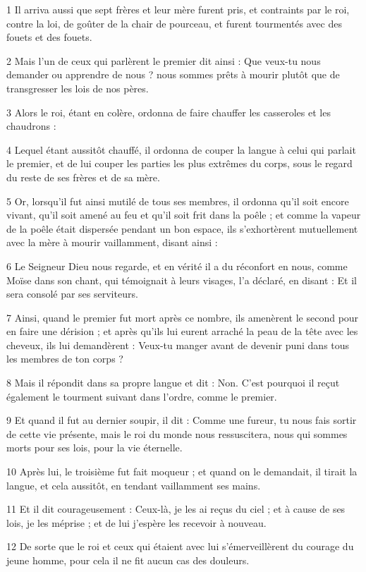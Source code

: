 \par 1 Il arriva aussi que sept frères et leur mère furent pris, et contraints par le roi, contre la loi, de goûter de la chair de pourceau, et furent tourmentés avec des fouets et des fouets.
\par 2 Mais l'un de ceux qui parlèrent le premier dit ainsi : Que veux-tu nous demander ou apprendre de nous ? nous sommes prêts à mourir plutôt que de transgresser les lois de nos pères.
\par 3 Alors le roi, étant en colère, ordonna de faire chauffer les casseroles et les chaudrons :
\par 4 Lequel étant aussitôt chauffé, il ordonna de couper la langue à celui qui parlait le premier, et de lui couper les parties les plus extrêmes du corps, sous le regard du reste de ses frères et de sa mère.
\par 5 Or, lorsqu'il fut ainsi mutilé de tous ses membres, il ordonna qu'il soit encore vivant, qu'il soit amené au feu et qu'il soit frit dans la poêle ; et comme la vapeur de la poêle était dispersée pendant un bon espace, ils s'exhortèrent mutuellement avec la mère à mourir vaillamment, disant ainsi :
\par 6 Le Seigneur Dieu nous regarde, et en vérité il a du réconfort en nous, comme Moïse dans son chant, qui témoignait à leurs visages, l'a déclaré, en disant : Et il sera consolé par ses serviteurs.
\par 7 Ainsi, quand le premier fut mort après ce nombre, ils amenèrent le second pour en faire une dérision ; et après qu'ils lui eurent arraché la peau de la tête avec les cheveux, ils lui demandèrent : Veux-tu manger avant de devenir puni dans tous les membres de ton corps ?
\par 8 Mais il répondit dans sa propre langue et dit : Non. C'est pourquoi il reçut également le tourment suivant dans l'ordre, comme le premier.
\par 9 Et quand il fut au dernier soupir, il dit : Comme une fureur, tu nous fais sortir de cette vie présente, mais le roi du monde nous ressuscitera, nous qui sommes morts pour ses lois, pour la vie éternelle.
\par 10 Après lui, le troisième fut fait moqueur ; et quand on le demandait, il tirait la langue, et cela aussitôt, en tendant vaillamment ses mains.
\par 11 Et il dit courageusement : Ceux-là, je les ai reçus du ciel ; et à cause de ses lois, je les méprise ; et de lui j'espère les recevoir à nouveau.
\par 12 De sorte que le roi et ceux qui étaient avec lui s'émerveillèrent du courage du jeune homme, pour cela il ne fit aucun cas des douleurs.
